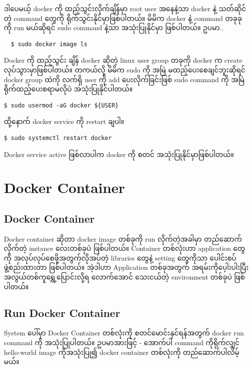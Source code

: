 \documentclass{article}
\begin{document}
ဒါပေမယ့် docker ကို ထည့်သွင်းလိုက်ချိန်မှာ root user အနေနဲ့သာ docker နဲ့
သတ်ဆိုင်တဲ့ command တွေကို ရိုက်သွင်းနိုင်မှာဖြစ်ပါတယ်။ မိမိက docker နဲ့
command တခုခုကို run မယ်ဆိုရင် sudo command နဲ့သာ အသုံးပြုနိုင်မှာ
ဖြစ်ပါတယ်။ ဥပမာ..

\begin{verbatim}
  $ sudo docker image ls
\end{verbatim}

Docker ကို ထည့်သွင်း ချိန် docker ဆိုတဲ့ linux user group တခုကို docker
က create လုပ်သွားမှာဖြစ်ပါတယ်။ တကယ်လို့ မိမိက sudo ကို အမြဲ
မထည့်ပေးစေချင်ဘူးဆိုရင် docker group ထဲကို လက်ရှိ user ကို add
ပေးလိုက်ခြင်းဖြစ် sudo command ကို အမြဲရိုက်ထည့်ပေးစရာမလိုပဲ
အသုံးပြုနိုင်ပါတယ်။

\begin{verbatim}
$ sudo usermod -aG docker ${USER}
\end{verbatim}

ထို့နောက် docker service ကို restart ချပါ။

\begin{verbatim}
$ sudo systemctl restart docker
\end{verbatim}

Docker service active ဖြစ်လာပါက docker ကို စတင်
အသုံးပြုနိုင်မှာဖြစ်ပါတယ်။

\section{Docker Container}\label{docker-container-1}

\subsection{Docker Container}\label{docker-container-2}

Docker container ဆိုတာ docker image တစ်ခုကို run လိုက်တဲ့အခါမှာ
တည်ဆောက်လိုက်တဲ့ instance လေးတစ်ခုပဲ ဖြစ်ပါတယ်။ Container တစ်လုံးဟာ
application တွေကို အလုပ်လုပ်စေဖို့အတွက်လိုအပ်တဲ့ libraries တွေနဲ့
setting တွေကိုသာ ပေါင်းစပ်ဖွဲ့စည်းထားတာ ဖြစ်ပါတယ်။ အဲ့ဒါဟာ Application
တစ်ခုအတွက် အရမ်းကိုပေ့ါးပါးပြီး အလွယ်တစ်ကူရွှေ့ပြောင်းလို့ရ လောက်အောင်
သေးငယ်တဲ့ environment တစ်ခုပဲ ဖြစ်ပါတယ်။

\subsection{Run Docker Container}\label{run-docker-container}

System ပေါ်မှာ Docker Container တစ်လုံးကို စတင်မောင်းနှင်ရန်အတွက် docker
run command ကို အသုံးပြုပါတယ်။ ဥပမာအားဖြင့် - အောက်ပါ command
ကိုရိုက်လျှင် hello-world image ကိုအသုံးပြု၍ docker container တစ်လုံးကို
တည်ဆောက်ပါလိမ့်မယ်။
\end{document}
